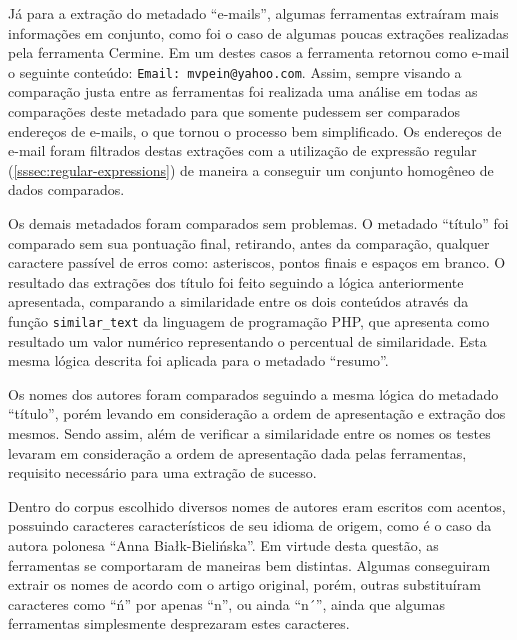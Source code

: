 Já para a extração do metadado ``e-mails'', algumas ferramentas extraíram mais informações em conjunto, como foi o caso de algumas poucas extrações realizadas pela ferramenta Cermine. Em um destes casos a ferramenta retornou como e-mail o seguinte conteúdo: \texttt{Email: mvpein@yahoo.com}. Assim, sempre visando a comparação justa entre as ferramentas foi realizada uma análise em todas as comparações deste metadado para que somente pudessem ser comparados endereços de e-mails, o que tornou o processo bem simplificado. Os endereços de e-mail foram filtrados destas extrações com a utilização de expressão regular (\autoref{sssec:regular-expressions}) de maneira a conseguir um conjunto homogêneo de dados comparados.

Os demais metadados foram comparados sem problemas. O metadado ``título'' foi comparado sem sua pontuação final, retirando, antes da comparação, qualquer caractere passível de erros como: asteriscos, pontos finais e espaços em branco. O resultado das extrações dos título foi feito seguindo a lógica anteriormente apresentada, comparando a similaridade entre os dois conteúdos através da função \texttt{similar\_text} da linguagem de programação PHP, que apresenta como resultado um valor numérico representando o percentual de similaridade. Esta mesma lógica descrita foi aplicada para o metadado ``resumo''.

Os nomes dos autores foram comparados seguindo a mesma lógica do metadado ``título'', porém levando em consideração a ordem de apresentação e extração dos mesmos. Sendo assim, além de verificar a similaridade entre os nomes os testes levaram em consideração a ordem de apresentação dada pelas ferramentas, requisito necessário para uma extração de sucesso.


Dentro do corpus escolhido diversos nomes de autores eram escritos com acentos, possuindo caracteres característicos de seu idioma de origem, como é o caso da autora polonesa ``Anna Białk-Bielińska''. Em virtude desta questão, as ferramentas se comportaram de maneiras bem distintas. Algumas conseguiram extrair os nomes de acordo com o artigo original, porém, outras substituíram caracteres como ``ń'' por apenas ``n'', ou ainda ``n´'', ainda que algumas ferramentas simplesmente desprezaram estes caracteres.

